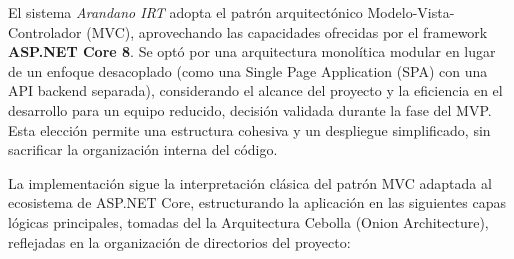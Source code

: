 El sistema \textit{Arandano IRT} adopta el patrón arquitectónico Modelo-Vista-Controlador (MVC), aprovechando las capacidades ofrecidas por el framework \textbf{ASP.NET Core 8}. Se optó por una arquitectura monolítica modular en lugar de un enfoque desacoplado (como una Single Page Application (SPA) con una API backend separada), considerando el alcance del proyecto y la eficiencia en el desarrollo para un equipo reducido, decisión validada durante la fase del MVP. Esta elección permite una estructura cohesiva y un despliegue simplificado, sin sacrificar la organización interna del código.

La implementación sigue la interpretación clásica del patrón MVC adaptada al ecosistema de ASP.NET Core, estructurando la aplicación en las siguientes capas lógicas principales, tomadas del la Arquitectura Cebolla (Onion Architecture), reflejadas en la organización de directorios del proyecto:


